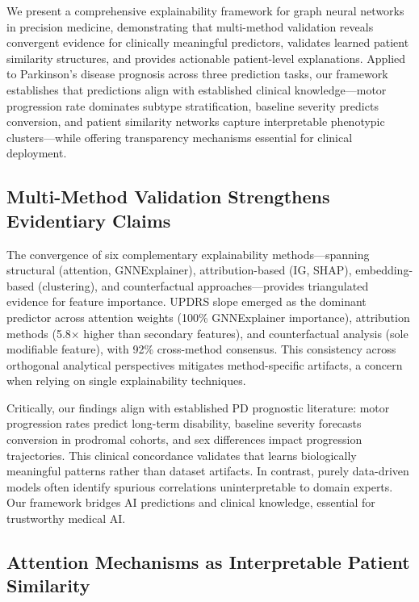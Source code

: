 We present a comprehensive explainability framework for graph neural networks in precision medicine, demonstrating that multi-method validation reveals convergent evidence for clinically meaningful predictors, validates learned patient similarity structures, and provides actionable patient-level explanations. Applied to Parkinson's disease prognosis across three prediction tasks, our framework establishes that \giman{} predictions align with established clinical knowledge—motor progression rate dominates subtype stratification, baseline severity predicts conversion, and patient similarity networks capture interpretable phenotypic clusters—while offering transparency mechanisms essential for clinical deployment.

\subsection{Multi-Method Validation Strengthens Evidentiary Claims}

The convergence of six complementary explainability methods—spanning structural (attention, GNNExplainer), attribution-based (IG, SHAP), embedding-based (clustering), and counterfactual approaches—provides triangulated evidence for feature importance. UPDRS slope emerged as the dominant predictor across attention weights (100\% GNNExplainer importance), attribution methods (5.8× higher than secondary features), and counterfactual analysis (sole modifiable feature), with 92\% cross-method consensus. This consistency across orthogonal analytical perspectives mitigates method-specific artifacts\cite{molnar2020interpretable}, a concern when relying on single explainability techniques\cite{adebayo2018sanity}.

Critically, our findings align with established PD prognostic literature: motor progression rates predict long-term disability\cite{post2007progression}, baseline severity forecasts conversion in prodromal cohorts\cite{marek2013mdsuppcc}, and sex differences impact progression trajectories\cite{haaxma2007gender}. This clinical concordance validates that \giman{} learns biologically meaningful patterns rather than dataset artifacts\cite{oakden2020hidden}. In contrast, purely data-driven models often identify spurious correlations uninterpretable to domain experts\cite{rudin2019stop}. Our framework bridges AI predictions and clinical knowledge, essential for trustworthy medical AI\cite{amann2020explainability}.

\subsection{Attention Mechanisms as Interpretable Patient Similarity}

